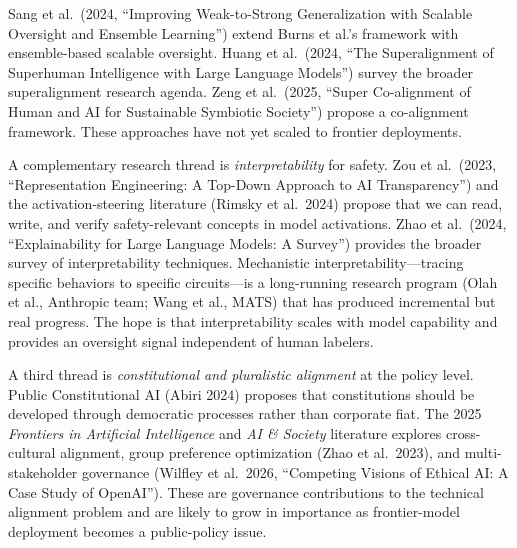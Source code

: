 Sang et al.~(2024, ``Improving Weak-to-Strong Generalization with Scalable Oversight and Ensemble Learning'') extend Burns et al.'s framework with ensemble-based scalable oversight. Huang et al.~(2024, ``The Superalignment of Superhuman Intelligence with Large Language Models'') survey the broader superalignment research agenda. Zeng et al.~(2025, ``Super Co-alignment of Human and AI for Sustainable Symbiotic Society'') propose a co-alignment framework. These approaches have not yet scaled to frontier deployments.

A complementary research thread is \emph{interpretability} for safety. Zou et al.~(2023, ``Representation Engineering: A Top-Down Approach to AI Transparency'') and the activation-steering literature (Rimsky et al.~2024) propose that we can read, write, and verify safety-relevant concepts in model activations. Zhao et al.~(2024, ``Explainability for Large Language Models: A Survey'') provides the broader survey of interpretability techniques. Mechanistic interpretability---tracing specific behaviors to specific circuits---is a long-running research program (Olah et al., Anthropic team; Wang et al., MATS) that has produced incremental but real progress. The hope is that interpretability scales with model capability and provides an oversight signal independent of human labelers.

A third thread is \emph{constitutional and pluralistic alignment} at the policy level. Public Constitutional AI (Abiri 2024) proposes that constitutions should be developed through democratic processes rather than corporate fiat. The 2025 \emph{Frontiers in Artificial Intelligence} and \emph{AI \& Society} literature explores cross-cultural alignment, group preference optimization (Zhao et al.~2023), and multi-stakeholder governance (Wilfley et al.~2026, ``Competing Visions of Ethical AI: A Case Study of OpenAI''). These are governance contributions to the technical alignment problem and are likely to grow in importance as frontier-model deployment becomes a public-policy issue.

